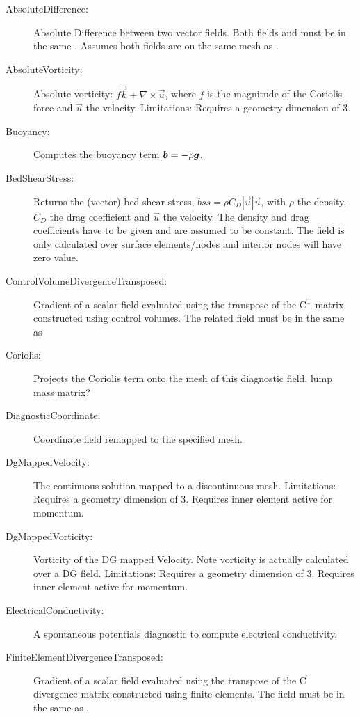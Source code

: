 \begin{description}    
 \item[AbsoluteDifference:]Absolute Difference between two vector fields. Both fields and  must be in the same . Assumes both fields are on the same mesh as .  
 \item[AbsoluteVorticity:]Absolute vorticity:  $f\vec{k} + \nabla \times \vec{u}$, where $f$ is the magnitude of the Coriolis force and $\vec{u}$ the velocity.
	Limitations: Requires a geometry dimension of 3.
 \item[Buoyancy:]Computes the buoyancy term ${\mbox{\boldmath$b$}}=-\rho{\mbox{\boldmath$g$}}$.
 \item[BedShearStress:]Returns the (vector) bed shear stress, $bss = \rho C_D|\vec{u}|\vec{u}$, with $\rho$ the density, $C_D$ the drag coefficient and $\vec{u}$ the velocity. The density and drag coefficients have to be given and are assumed to be constant. The field is only calculated over surface elements/nodes and interior nodes will have zero value.  
 \item[ControlVolumeDivergenceTransposed:]Gradient of a scalar field evaluated using the transpose of the $\mathrm{C}^\mathrm{T}$ matrix constructed using control volumes. The related field must be in the same  as 
 \item[Coriolis:]Projects the Coriolis term onto the mesh of this diagnostic field. lump mass matrix? 
 \item[DiagnosticCoordinate:]Coordinate field remapped to the specified mesh.   
 \item[DgMappedVelocity:]The continuous solution mapped to a discontinuous mesh.
  Limitations: Requires a geometry dimension of 3. Requires inner element active for momentum.
 \item[DgMappedVorticity:]Vorticity of the DG mapped Velocity. Note vorticity is actually calculated over a DG field.
  Limitations: Requires a geometry dimension of 3. Requires inner element active for momentum.
 \item[ElectricalConductivity:]A spontaneous potentials diagnostic to compute electrical conductivity.
 \item[FiniteElementDivergenceTransposed:]Gradient of a scalar field evaluated using the transpose of the $\mathrm{C}^\mathrm{T}$ divergence matrix constructed using finite elements. The field must be in the same  as .   

\end{description}
